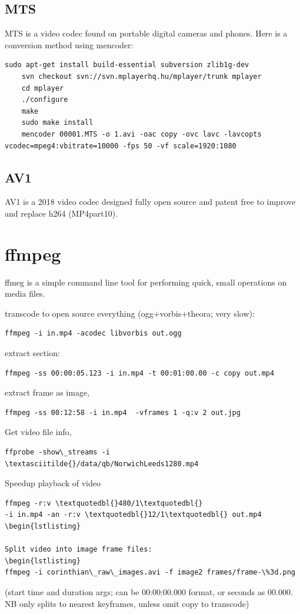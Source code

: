 \documentclass[oneside,english]{scrbook}
\begin{document}
\section{MTS}
MTS is a video codec found on portable digital cameras and phones.
Here is a conversion method using mencoder:

\begin{lstlisting}
sudo apt-get install build-essential subversion zlib1g-dev
	svn checkout svn://svn.mplayerhq.hu/mplayer/trunk mplayer
	cd mplayer
	./configure
	make
	sudo make install
	mencoder 00001.MTS -o 1.avi -oac copy -ovc lavc -lavcopts vcodec=mpeg4:vbitrate=10000 -fps 50 -vf scale=1920:1080
\end{lstlisting}

\section{AV1}
AV1 is a 2018 video codec designed fully open source and patent free to improve and replace h264 (MP4part10).

\chapter{ffmpeg}

ffmeg is a simple command line tool for performing quick, small operations on media files.

transcode to open source everything (ogg+vorbis+theora; very slow):
\begin{lstlisting}
ffmpeg -i in.mp4 -acodec libvorbis out.ogg
\end{lstlisting}

extract section: 
\begin{lstlisting}
ffmpeg -ss 00:00:05.123 -i in.mp4 -t 00:01:00.00 -c copy out.mp4 
\end{lstlisting}

extract frame as image,
\begin{lstlisting}
ffmpeg -ss 00:12:58 -i in.mp4  -vframes 1 -q:v 2 out.jpg
\end{lstlisting}

Get video file info,
\begin{lstlisting}
ffprobe -show\_streams -i \textasciitilde{}/data/qb/NorwichLeeds1280.mp4
\end{lstlisting}

Speedup playback of video 
\begin{lstlisting}
ffmpeg -r:v \textquotedbl{}480/1\textquotedbl{}
-i in.mp4 -an -r:v \textquotedbl{}12/1\textquotedbl{} out.mp4
\begin{lstlisting}

Split video into image frame files: 
\begin{lstlisting}
ffmpeg -i corinthian\_raw\_images.avi -f image2 frames/frame-\%3d.png 
\end{lstlisting}
(start time and duration args; can be 00:00:00.000 format, or seconds as 00.000. NB only splits to nearest keyframes, unless omit copy to transcode)
\end{document}
